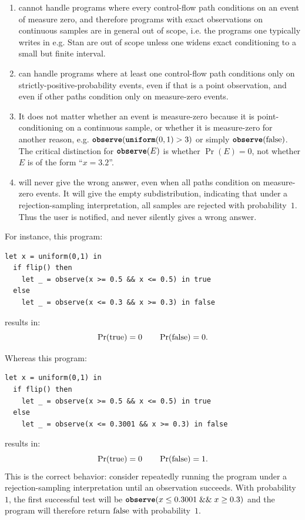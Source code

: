 \begin{enumerate}
  \item \Slice{} cannot handle programs where every control-flow path conditions on an event of measure zero, and therefore programs with exact observations on continuous samples are in general out of scope, i.e. the programs one typically writes in e.g. Stan are out of scope unless one widens exact conditioning to a small but finite interval.

  \item \Slice{} can handle programs where at least one control-flow path conditions only on strictly-positive-probability events, even if that is a point observation, and even if other paths condition only on measure-zero events.

  \item It does not matter whether an event is measure-zero because it is point-conditioning on a continuous sample, or whether it is measure-zero for another reason, e.g. $\textnormal{\ttfamily\bfseries observe}(\textnormal{\ttfamily\bfseries uniform}(0,1) > 3)$ or simply $\textnormal{\ttfamily\bfseries observe}(\textnormal{false})$. The critical distinction for $\textnormal{\ttfamily\bfseries observe}(E)$ is whether $\Pr(E)=0$, not whether $E$ is of the form ``$x=3.2$''.

  \item \Slice{} will never give the wrong answer, even when all paths condition on measure-zero events. It will give the empty subdistribution, indicating that under a rejection-sampling interpretation, all samples are rejected with probability~$1$. Thus the user is notified, and \Slice{} never silently gives a wrong answer.
\end{enumerate}

For instance, this program:
\begin{lstlisting}[aboveskip=1em,belowskip=1em]
  let x = uniform(0,1) in
  if flip() then
    let _ = observe(x >= 0.5 && x <= 0.5) in true
  else
    let _ = observe(x <= 0.3 && x >= 0.3) in false
\end{lstlisting}
results in:
\[
\Pr(\textnormal{true}) = 0
\qquad
\Pr(\textnormal{false}) = 0.
\]

Whereas this program:
\begin{lstlisting}[aboveskip=1em,belowskip=1em]
  let x = uniform(0,1) in
  if flip() then
    let _ = observe(x >= 0.5 && x <= 0.5) in true
  else
    let _ = observe(x <= 0.3001 && x >= 0.3) in false
\end{lstlisting}
results in:
\[
\Pr(\textnormal{true}) = 0
\qquad
\Pr(\textnormal{false}) = 1.
\]
This is the correct behavior: consider repeatedly running the program under a rejection-sampling interpretation until an observation succeeds. With probability~$1$, the first successful test will be $\textnormal{\ttfamily\bfseries observe}(x \leq 0.3001 \mathrel{\&\&} x \geq 0.3)$ and the program will therefore return $\textnormal{false}$ with probability~$1$.


